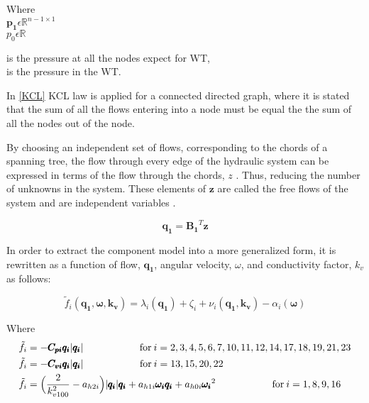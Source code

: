 \begin{minipage}[t]{0.20\textwidth}
Where\\
\hspace*{8mm} $\pmb{p_1} \epsilon \mathbb{R}^{n-1 \times 1}$  \\
\hspace*{8mm} $p_0 \epsilon \mathbb{R} $ 
\end{minipage}
\begin{minipage}[t]{0.68\textwidth}
\vspace*{2mm}
\hspace*{4mm} is the pressure at all the nodes expect for WT,\\
\hspace*{4mm} is the pressure in the WT.
\end{minipage}

In \eqref{KCL} KCL law is applied for a connected directed graph, where it is stated that the sum of all the flows entering 
into a node must be equal the the sum of all the nodes out of the node.

By choosing an independent set of flows, corresponding to the chords of a spanning tree, the 
flow through every edge of the hydraulic system can be expressed in terms of the flow through the chords, $z$ \cite{GraphModel}.
Thus, reducing the number of unknowns in the system. These elements of $\pmb{z}$ are called the free 
flows of the system and are independent variables \cite{GraphTheoryCarsten}.

\begin{equation}
  \pmb{q_1} = \pmb{B_1} ^{T}  \pmb{z}
  \label{ChordRelation}
\end{equation}

In order to extract the component model into a more generalized form, it is rewritten as a function of flow, $\pmb{q_1}$, angular velocity, $\omega$, and conductivity factor, $k_v$ as follows:

\begin{equation}
  \tilde{f}_i(\pmb{q_1}, \pmb{\omega}, \pmb{k_v}) = \lambda_i(\pmb{q_1}) + \zeta_i + \nu_i(\pmb{q_1}, \pmb{k_v}) - \alpha_i(\pmb{\omega})
  \label{ComponentFunction}
\end{equation}

Where\\
\begin{align}
\tilde{f}_i &= -\pmb{C_{pi} q_i} |\pmb{q_i}|  \hskip 2cm  \text{for}\: i = 2,3,4,5,6,7,10,11,12,14,17,18,19,21,23 \\
\tilde{f}_i &= -\pmb{C_{vi} q_i} |\pmb{q_i}|  \hskip 2cm  \text{for}\:i = 13,15,20,22\\
\tilde{f}_i &= \Big(\frac{2}{k_{v100}^2} - a_{h2i}\Big)|\pmb{q_i}| \pmb{q_i}  + a_{h1i} \pmb{\omega_{i}} \pmb{q_i} + a_{h0i}\pmb{{\omega_i}}^2 \hskip 2cm  \text{for}\: i = 1,8,9,16
\end{align}

